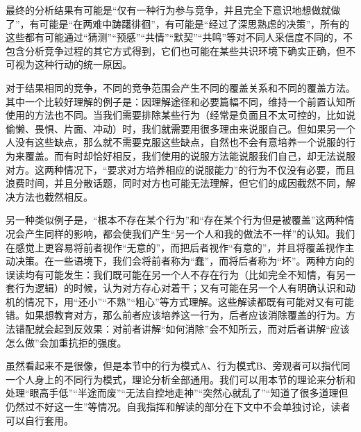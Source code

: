 \begin{explain}
最终的分析结果有可能是“仅有一种行为参与竞争，并且完全下意识地想做就做了”，有可能是“在两难中踌躇徘徊”，有可能是“经过了深思熟虑的决策”，所有的这些都有可能通过“猜测”“预感”“共情”“默契”“共鸣”等对不同人采信度不同的，不包含分析竞争过程的其它方式得到，它们也可能在某些共识环境下确实正确，但不可视为这种行动的统一原因。

对于结果相同的竞争，不同的竞争范围会产生不同的覆盖关系和不同的覆盖方法。其中一个比较好理解的例子是：因理解途径和必要篇幅不同，维持一个前置认知所使用的方法也不同。当我们需要排除某些行为（经常是负面且不太可控的，比如说偷懒、畏惧、片面、冲动）时，我们就需要用很多理由来说服自己。但如果另一个人没有这些缺点，那么就不需要克服这些缺点，自然也不会有意培养一个说服的行为来覆盖。而有时却恰好相反，我们使用的说服方法能说服我们自己，却无法说服对方。这两种情况下，“要求对方培养相应的说服能力”的行为不仅没有必要，而且浪费时间，并且分散话题，同时对方也可能无法理解，但它们的成因截然不同，解决方法也截然相反。


另一种类似例子是，“根本不存在某个行为”和“存在某个行为但是被覆盖”这两种情况会产生同样的影响，都会使我们产生“另一个人和我的做法不一样”的认知。我们在感觉上更容易将前者视作“无意的”，而把后者视作“有意的”，并且将覆盖视作主动决策。在一些语境下，我们会将前者称为“蠢”，而将后者称为“坏”。两种方向的误读均有可能发生：我们既可能在另一个人不存在行为（比如完全不知情，有另一套行为逻辑）的时候，认为对方存心对着干；又有可能在另一个人有明确认识和动机的情况下，用“还小”“不熟”“粗心”等方式理解。这些解读都既有可能对又有可能错。如果想教育对方，那么前者应该培养这一行为，后者应该消除覆盖的行为。方法错配就会起到反效果：对前者讲解“如何消除”会不知所云，而对后者讲解“应该怎么做”会加重抗拒的强度。
\end{explain}

\begin{explain}
虽然看起来不是很像，但是本节中的行为模式A、行为模式B、旁观者可以指代同一个人身上的不同行为模式，理论分析全部通用。我们可以用本节的理论来分析和处理“眼高手低”“半途而废”“无法自控地走神”“突然心就乱了”“知道了很多道理但仍然过不好这一生”等情况。自我指挥和解读的部分在下文中不会单独讨论，读者可以自行套用。
\end{explain}
